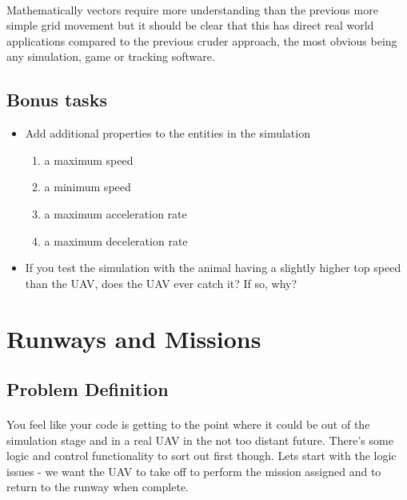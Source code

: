 \documentclass[11pt]{book}
\begin{document}
\paragraph{} Mathematically vectors require more understanding than the previous more simple grid movement but it should be clear that this has direct real world applications compared to the previous cruder approach, the most obvious being any simulation, game or tracking software.

\subsection{Bonus tasks}

\begin{itemize}
\item Add additional properties to the entities in the simulation
    \begin{enumerate} 
    \item a maximum speed
    \item a minimum speed
    \item a maximum acceleration rate
    \item a maximum deceleration rate
    \end{enumerate}
\item If you test the simulation with the animal having a slightly higher top speed than the UAV, does the UAV ever catch it? If so, why?
\end{itemize}

\clearpage



\section{Runways and Missions}

\subsection{Problem Definition}

\paragraph{} You feel like your code is getting to the point where it could be out of the simulation stage and in a real UAV in the not too distant future. There's some logic and control functionality to sort out first though. Lets start with the logic issues - we want the UAV to take off to perform the mission assigned and to return to the runway when complete.
\end{document}
